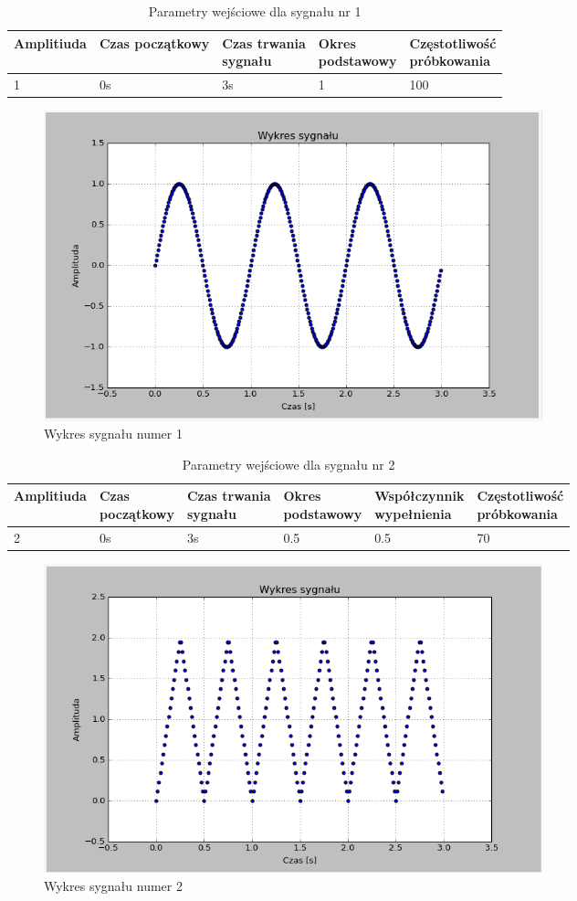 \documentclass{article}
\begin{document}
{{    \begin{table}[h!]
    \centering
    \begin{tabular}{|l|l|l|l|l|}
        \hline
        Amplitiuda & Czas początkowy & \shortstack{Czas trwania \\ sygnału} & \shortstack{Okres \\ podstawowy} & \shortstack{Częstotliwość\\ próbkowania}   \\ \hline
        1 & 0s & 3s & 1 & 100           \\ \hline
    \end{tabular}
    \caption{Parametry wejściowe dla sygnału nr 1}
    \end{table}
    \FloatBarrier
    \begin{figure}[h!]
    \centering
    \includegraphics[width=0.7\textwidth]{img/splot1.png}
    \caption{Wykres sygnału numer 1}
    \end{figure}
    \FloatBarrier
    \begin{table}[h!]
    \centering
    \begin{tabular}{|l|l|l|l|l|l|}
        \hline
        Amplitiuda & \shortstack{Czas \\ początkowy} & \shortstack{Czas trwania \\ sygnału} & \shortstack{Okres \\ podstawowy} & \shortstack{Współczynnik\\ wypełnienia}  & \shortstack{Częstotliwość\\ próbkowania}   \\ \hline
        2 & 0s & 3s & 0.5 & 0.5 & 70           \\ \hline
    \end{tabular}
    \caption{Parametry wejściowe dla sygnału nr 2}
    \end{table}
    \begin{figure}[h!]
    \centering
    \includegraphics[width=0.7\textwidth]{img/splot6.png}
    \caption{Wykres sygnału numer 2}
    \end{figure}

}}
\end{document}
